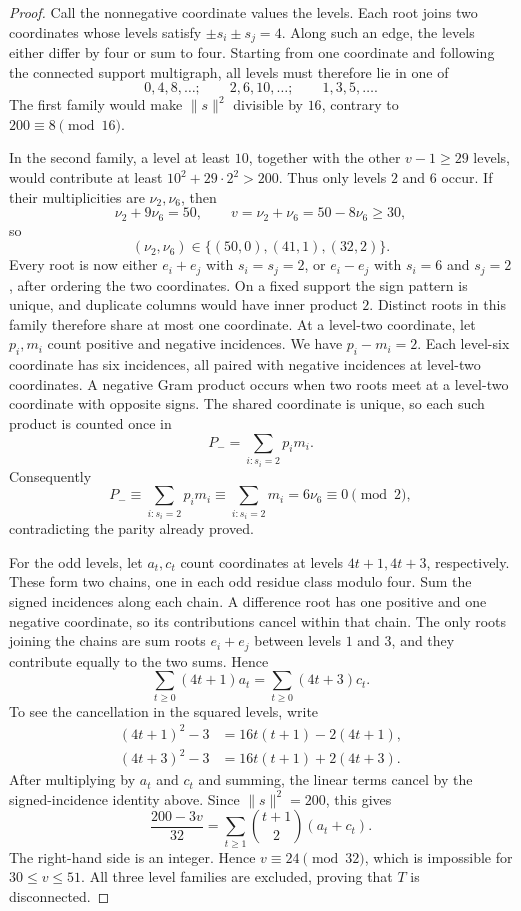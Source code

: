 \documentclass[a4paper,10pt,reqno]{amsart}
\theoremstyle{plain}
\theoremstyle{definition}
\theoremstyle{remark}
\begin{document}
\begin{proof}
Call the nonnegative coordinate values the levels. Each root joins two
coordinates whose levels satisfy \(\pm s_i\pm s_j=4\).  Along such an edge, the levels either differ by
four or sum to four.  Starting from one coordinate and following
the connected support multigraph, all levels must therefore lie in one of
\[
0,4,8,\ldots;\qquad
2,6,10,\ldots;\qquad
1,3,5,\ldots.
\]
The first family would make \(\lVert s\rVert^2\) divisible by \(16\), contrary
to \(200\equiv8\pmod {16}\).

In the second family, a level at least \(10\), together with the other
\(v-1\ge29\) levels, would contribute at least
\(10^2+29\cdot2^2>200\).  Thus only levels \(2\) and \(6\) occur.  If their
multiplicities are \(\nu_2,\nu_6\), then
\[
\nu_2+9\nu_6=50,\qquad
v=\nu_2+\nu_6=50-8\nu_6\ge30,
\]
so
\[
(\nu_2,\nu_6)\in\{(50,0),(41,1),(32,2)\}.
\]
Every root is now either \(e_i+e_j\) with \(s_i=s_j=2\), or
\(e_i-e_j\) with \(s_i=6\) and \(s_j=2\), after ordering the two coordinates.
On a fixed support the sign pattern is unique, and duplicate columns
would have inner product \(2\).  Distinct roots in this family therefore
share at most one coordinate.  At a level-two coordinate, let \(p_i,m_i\)
count positive and negative incidences.  We have \(p_i-m_i=2\).
Each level-six coordinate has six incidences, all paired with negative
incidences at level-two coordinates.  A negative Gram product occurs when
two roots meet at a level-two coordinate with opposite signs.  The shared
coordinate is unique, so each such product is counted once in
\[
P_-=\sum_{i:s_i=2}p_im_i.
\]
Consequently
\[
P_-\equiv\sum_{i:s_i=2} p_im_i
\equiv\sum_{i:s_i=2} m_i
=6\nu_6
\equiv0\pmod2,
\]
contradicting the parity already proved.

For the odd levels, let \(a_t,c_t\) count coordinates at levels
\(4t+1,4t+3\), respectively. These form two chains, one in each odd residue
class modulo four. Sum the signed incidences along each chain. A difference
root has one positive and one negative coordinate, so its contributions
cancel within that chain.  The only roots
joining the chains are sum roots \(e_i+e_j\) between levels \(1\) and
\(3\), and they contribute equally to the two sums.  Hence
\[
\sum_{t\ge0}(4t+1)a_t
=\sum_{t\ge0}(4t+3)c_t.
\]
To see the cancellation in the squared levels, write
\[
\begin{aligned}
(4t+1)^2-3&=16t(t+1)-2(4t+1),\\
(4t+3)^2-3&=16t(t+1)+2(4t+3).
\end{aligned}
\]
After multiplying by \(a_t\) and \(c_t\) and summing, the linear terms
cancel by the signed-incidence identity above.  Since
\(\lVert s\rVert^2=200\), this gives
\[
\frac{200-3v}{32}
=\sum_{t\ge1}\binom{t+1}{2}(a_t+c_t).
\]
The right-hand side is an integer.  Hence \(v\equiv24\pmod {32}\), which is impossible for
\(30\le v\le51\).  All three level families are excluded, proving that \(T\)
is disconnected.
\end{proof}
\end{document}
